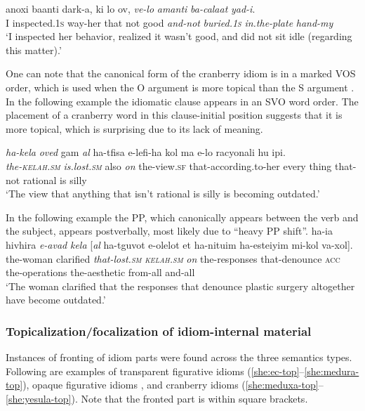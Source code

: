 \documentclass[output=paper]{langsci/langscibook}
\begin{document}
	\ea\label{she:taman-order}
    	\gll {\alef}anoxi ba{\het}anti dark-a, ki lo {\tet}ov, \textit{ve-lo} \textit{{\tet}amanti} \textit{ba-cala{\het}at} \textit{yad-i}.\\
    	   I inspected.\textsc{1s} way-her that not good \textit{and-not} \textit{buried.\textsc{1s}} \textit{in.the-plate} \textit{hand-my}\\
    	\glt `I inspected her behavior, realized it wasn't good, and did not sit idle (regarding this matter).'
	\z

One can note that the canonical form of the cranberry idiom  is in a marked VOS order, which is used when the O argument is more topical than the S argument \citep{melnik16}. In the following example the idiomatic clause appears in an SVO word order. The placement of a cranberry word in this clause-initial position suggests that it is more topical, which is surprising due to its lack of meaning.

    \ea\label{she:kelax-top}
         \gll \textit{ha-kela{\het}} \textit{{\alef}oved} gam \textit{{\ayin}al} ha-tfisa {\shin}e-lefi-ha kol ma {\shin}e-lo racyonali hu {\tet}ip{\shin}i.\\
             \textit{the-\textsc{kelah}.\textsc{sm}} \textit{is.lost.\textsc{sm}} also \textit{on} the-view.\textsc{sf} that-according.to-her every thing that-not rational is silly\\
        \glt `The view that anything that isn't rational is silly is becoming outdated.'
    \z


In the following example the PP, which canonically appears between the verb and the subject, appears postverbally, most likely due to ``heavy PP shift''.
    \ea\label{she:kelax-order}
        \gll ha-{\alef}i{\shin}a hivhira \textit{{\shin}e-{\alef}avad} \textit{kela{\het}} \textnormal{[}\textit{{\ayin}al} ha-tguvot {\shin}e-{\shin}olelot {\alef}et ha-nitu{\het}im ha-{\alef}este{\tet}iyim mi-kol va-xol\textnormal{]}.\\
            the-woman clarified \textit{that-lost.\textsc{sm}} \textit{\textsc{kelah}.\textsc{sm}} \textit{on} the-responses that-denounce \textsc{acc} the-operations the-aesthetic from-all and-all\\
        \glt `The woman clarified that the responses that denounce plastic surgery altogether have become outdated.'
    \z


\subsubsection{Topicalization/focalization of idiom-internal material}
\label{she:sec:topicalization}
Instances of fronting of idiom parts were found across the three semantics types. Following are examples of transparent figurative idioms (\ref{she:ec-top}--\ref{she:medura-top}), opaque figurative idioms , and cranberry idioms (\ref{she:meduxa-top}--\ref{she:yesula-top}). Note that the fronted part is within square brackets.
\end{document}
